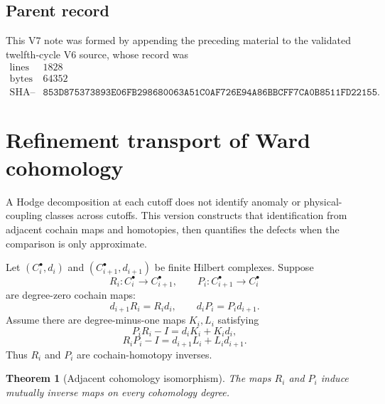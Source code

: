 \documentclass[11pt]{article}
\newtheorem{theorem}{Theorem}[section]
\theoremstyle{remark}
\begin{document}
\subsection{Parent record}

This V7 note was formed by appending the preceding material to the
validated twelfth-cycle V6 source, whose record was
\[
\begin{array}{c|c}
\text{lines}&1828\\
\text{bytes}&64352\\
\text{SHA--256}&
\texttt{853D875373893E06FB298680063A51C0AF726E94A86BBCFF7CA0B8511FD22155}.
\end{array}                                                     \tag{7.26}
\]


\section{Refinement transport of Ward cohomology}
\label{sec:v12v8}

A Hodge decomposition at each cutoff does not identify anomaly or
physical-coupling classes across cutoffs.  This version constructs
that identification from adjacent cochain maps and homotopies, then
quantifies the defects when the comparison is only approximate.

Let \((C_i^\bullet,d_i)\) and
\((C_{i+1}^\bullet,d_{i+1})\) be finite Hilbert complexes.  Suppose
\[
 R_i:C_i^\bullet\longrightarrow C_{i+1}^\bullet,\qquad
 P_i:C_{i+1}^\bullet\longrightarrow C_i^\bullet             \tag{8.1}
\]
are degree-zero cochain maps:
\[
 d_{i+1}R_i=R_id_i,\qquad
 d_iP_i=P_id_{i+1}.                                         \tag{8.2}
\]
Assume there are degree-minus-one maps \(K_i,L_i\) satisfying
\[
 P_iR_i-I=d_iK_i+K_id_i,                                    \tag{8.3}
\]
\[
 R_iP_i-I=d_{i+1}L_i+L_id_{i+1}.                            \tag{8.4}
\]
Thus \(R_i\) and \(P_i\) are cochain-homotopy inverses.

\begin{theorem}[Adjacent cohomology isomorphism]
\label{thm:v12v8-cohomology}
The maps \(R_i\) and \(P_i\) induce mutually inverse maps on every
cohomology degree.
\end{theorem}
\end{document}
